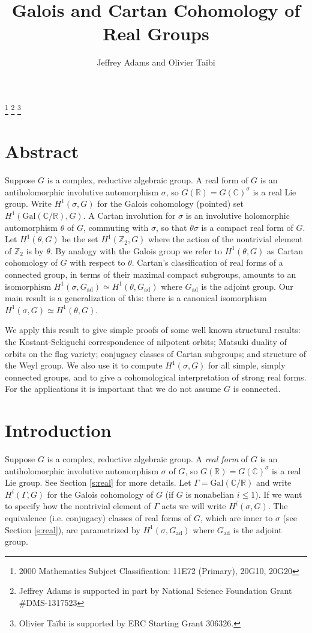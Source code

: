 \documentclass[10pt,leqno]{article}
\renewcommand{\sec}[1]{\section{#1}
\renewcommand{\theequation}{\thesection.\arabic{equation}}
  \setcounter{equation}{0}}
\newcommand{\Gad}{G_\mathrm{ad}}
\newcommand{\Gal}{\mathrm{Gal}}
\newcommand{\R}{\mathbb R}
\newcommand{\C}{\mathbb C}
\newcommand{\Ztwo}{\mathbb Z_2}
\begin{document}
\title{Galois and Cartan Cohomology of Real Groups}
\author{Jeffrey Adams and Olivier Ta\"ibi}
\maketitle

{\renewcommand{\thefootnote}{} 
\footnote{2000 Mathematics Subject Classification: 11E72 (Primary), 20G10, 20G20}
\footnote{Jeffrey Adams is supported in part by  National Science
Foundation Grant \#DMS-1317523}
\footnote{Olivier Ta\"ibi is supported by ERC Starting Grant 306326.}}


\section*{Abstract}
Suppose $G$ is a complex, reductive algebraic group. A real form of
$G$ is an antiholomorphic involutive automorphism $\sigma$, so
$G(\R)=G(\C)^\sigma$ is a real Lie group.  Write $H^1(\sigma,G)$ for
the Galois cohomology (pointed) set $H^1(\text{Gal}(\C/\R),G)$.  A
Cartan involution for $\sigma$ is an involutive holomorphic
automorphism $\theta$ of $G$, commuting with $\sigma$, so that
$\theta\sigma$ is a compact real form of $G$.  Let $H^1(\theta,G)$ be
the set $H^1(\Ztwo,G)$ where the action of the nontrivial element of
$\Ztwo$ is by $\theta$.  By analogy with the Galois group we refer to
$H^1(\theta,G)$ as Cartan cohomology of $G$ with respect to $\theta$.
Cartan's classification of real forms of a connected group, in terms
of their maximal compact subgroups, amounts to an isomorphism
$H^1(\sigma,\Gad)\simeq H^1(\theta,\Gad)$ where $\Gad$ is the adjoint
group.  Our main result is a generalization of this: there is a
canonical isomorphism $H^1(\sigma,G)\simeq H^1(\theta,G)$.

We apply this result to give simple proofs of some well
known structural results: the Kostant-Sekiguchi correspondence of
nilpotent orbits; Matsuki duality of orbits on the flag
variety; conjugacy classes of Cartan subgroups; and structure of the
Weyl group.  We also use it to compute $H^1(\sigma,G)$ for all simple,
simply connected groups, and  to give a cohomological
interpretation of strong real forms. For  the applications it 
is important that we do not assume $G$ is connected.

\sec{Introduction}

Suppose $G$ is a complex, reductive algebraic group.  A {\em real form} of
$G$ is an antiholomorphic involutive automorphism $\sigma$ of $G$, so
$G(\R)=G(\C)^\sigma$ is a real Lie group. See Section \ref{s:real} for more details.
Let $\Gamma=\Gal(\C/\R)$
and write $H^i(\Gamma,G)$ for the Galois cohomology of $G$ (if $G$ is
nonabelian $i\le 1$).  If we want to specify how the nontrivial
element of $\Gamma$ acts we will write $H^i(\sigma,G)$.  The
equivalence (i.e. conjugacy) classes of real forms of $G$, which are
inner to $\sigma$ (see Section \ref{s:real}), are parametrized by
$H^1(\sigma,\Gad)$ where $\Gad$ is the adjoint group.
\end{document}
